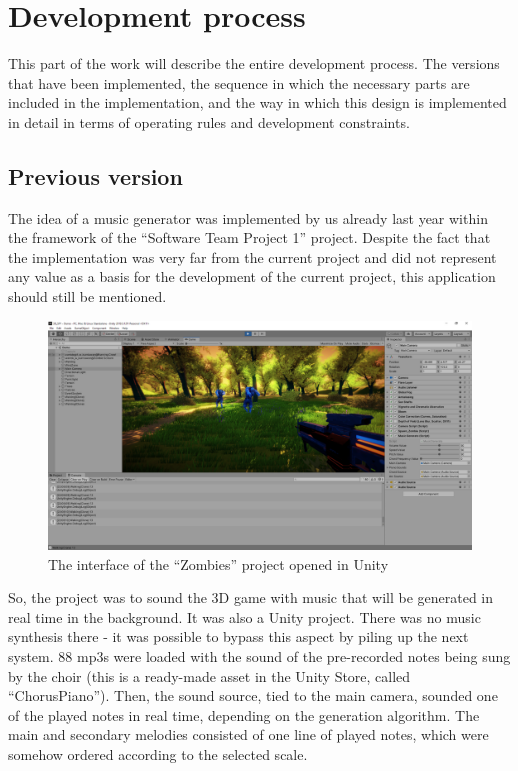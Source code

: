 \documentclass[thesis=B,english]{FITthesis}[2019/12/23]
\begin{document}
\section{Development process}

This part of the work will describe the entire development process. The versions that have been implemented, the sequence in which the necessary parts are included in the implementation, and the way in which this design is implemented in detail in terms of operating rules and development constraints.

\subsection{Previous version}

The idea of a music generator was implemented by us already last year within the framework of the “Software Team Project 1” project. Despite the fact that the implementation was very far from the current project and did not represent any value as a basis for the development of the current project, this application should still be mentioned.

\begin{figure}[!ht]
            \includegraphics[width=\textwidth]{thumbnail_Capture.png}
            \caption{The interface of the “Zombies” project opened in Unity}
            \label{fig:thumbnail_Capture}
\end{figure}

So, the project was to sound the 3D game with music that will be generated in real time in the background. It was also a Unity project. There was no music synthesis there - it was possible to bypass this aspect by piling up the next system. 88 mp3s were loaded with the sound of the pre-recorded notes being sung by the choir (this is a ready-made asset in the Unity Store, called “ChorusPiano”). Then, the sound source, tied to the main camera, sounded one of the played notes in real time, depending on the generation algorithm. The main and secondary melodies consisted of one line of played notes, which were somehow ordered according to the selected scale.
\end{document}

